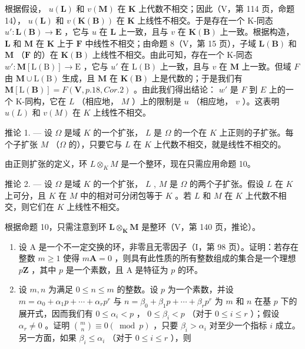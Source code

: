 根据假设， \(u(\mathbf{L})\) 和 \(v(\mathbf{M})\) 在 \(\mathbf{K}\) 上代数不相交；因此（V，第 114 页，命题 14）， \(u(\mathbf{L})\) 和 \(v(\mathbf{K}(\mathbf{B}))\) 在 \(\mathbf{K}\) 上线性不相交。于是存在一个 K-同态 \(u': \mathbf{L}(\mathbf{B}) \to \mathbf{E}\) ，它与 \(u\) 在 \(\mathbf{L}\) 上一致，且与 \(v\) 在 \(\mathbf{K}(\mathbf{B})\) 上一致。根据构造， \(\mathbf{L}\) 和 \(\mathbf{M}\) 在 \(\mathbf{K}\) 上于 \(\mathbf{F}\) 中线性不相交；由命题 8（V，第 15 页），子域 \(\mathbf{L}(\mathbf{B})\) 和 \(\mathbf{M}\) （\(\mathbf{F}\) 的）在 \(\mathbf{K}(\mathbf{B})\) 上线性不相交。由此可知，存在一个 K-同态 \(w' \colon \mathbf{M}[\mathrm{L}(\mathrm{B})] \to \mathrm{E}\) ，它与 \(u'\) 在 \(\mathrm{L}(\mathrm{B})\) 上一致，且与 \(v\) 在 \(\mathbf{M}\) 上一致。但域 \(F\) 由 \(\mathbf{M} \cup \mathrm{L}(\mathrm{B})\) 生成，且 \(\mathbf{M}\) 在 \(\mathbf{K}(\mathbf{B})\) 上是代数的；于是我们有 \(\mathbf{M}[\mathrm{L}(\mathbf{B})] = F(\mathbf{V}, p. 18, Cor. 2)\) 。由此我们得出结论： \(w'\) 是 \(F\) 到 \(E\) 上的一个 K-同构，它在 \(L\) （相应地， \(M\) ）上的限制是 \(u\) （相应地， \(v\) ）。这表明 \(u(L)\) 和 \(v(M)\) 在 \(K\) 上线性不相交。

推论 1. --- 设 \(\Omega\) 是域 \(K\) 的一个扩张， \(L\) 是 \(\Omega\) 的一个在 \(K\) 上正则的子扩张。每个子扩张 \(M\) （\(\Omega\) 的），只要它与 \(L\) 在 \(K\) 上代数不相交，就是线性不相交的。

由正则扩张的定义，环 \(L \otimes_{K} M\) 是一个整环，现在只需应用命题 10。

推论 2. --- 设 \(\Omega\) 是域 \(K\) 的一个扩张， \(L\) , \(M\) 是 \(\Omega\) 的两个子扩张。假设 \(L\) 在 \(K\) 上可分，且 \(K\) 在 \(M\) 中的相对可分闭包等于 \(K\) 。若 \(L\) 和 \(M\) 在 \(K\) 上代数不相交，则它们在 \(K\) 上线性不相交。

根据命题 10，只需注意到环 \(\mathbf{L} \otimes_{\mathbf{K}} \mathbf{M}\) 是整环（V，第 140 页，推论）。

\BourbakiExercises

\BourbakiExerciseGroup

\begin{enumerate}
\def\labelenumi{\arabic{enumi})}
\item
  设 A 是一个不一定交换的环，非零且无零因子（I，第 98 页）。证明：若存在整数 \(m \geqslant 1\) 使得 \(m\mathbf{A} = 0\) ，则具有此性质的所有整数组成的集合是一个理想 \(p\mathbf{Z}\) ，其中 \(p\) 是一个素数，且 A 是特征为 \(p\) 的环。
\item
  设 \(m, n\) 为满足 \(0 \leqslant n \leqslant m\) 的整数。设 \(p\) 为一个素数，并设 \(m = \alpha_0 + \alpha_1p + \cdots + \alpha_rp^r\) 与 \(n = \beta_0 + \beta_1p + \cdots + \beta_rp^r\) 为 \(m\) 和 \(n\) 在基 \(p\) 下的展开式，因而我们有 \(0 \leqslant \alpha_i < p\) ， \(0 \leqslant \beta_i < p\) （对于 \(0 \leqslant i \leqslant r\) ）；假设 \(\alpha_r \neq 0\) 。证明 \(\binom{m}{n} \equiv 0 (\bmod p)\) ，只要 \(\beta_i > \alpha_i\) 对至少一个指标 \(i\) 成立。另一方面，如果 \(\beta_i \leqslant \alpha_i\) （对于 \(0 \leqslant i \leqslant r\) ），则
\end{enumerate}

